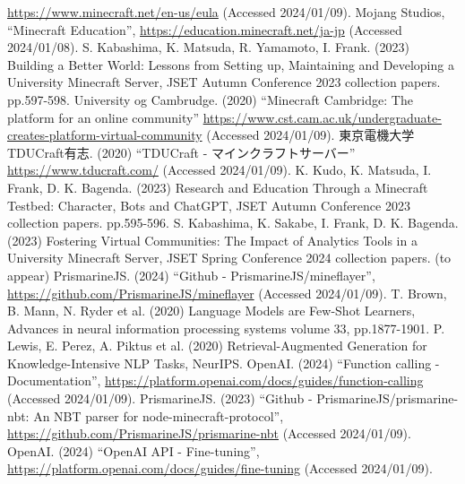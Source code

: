 \begin{thebibliography}{99}
    \url{https://www.minecraft.net/en-us/eula} (Accessed 2024/01/09).
    Mojang Studios, 
    ``Minecraft Education'', 
    \url{https://education.minecraft.net/ja-jp} (Accessed 2024/01/08).
    S. Kabashima, K. Matsuda, R. Yamamoto, I. Frank. (2023) 
    Building a Better World: Lessons from Setting up, Maintaining and Developing a University Minecraft Server, 
    JSET Autumn Conference 2023 collection papers. pp.597-598.
    University og Cambrudge. (2020)
    ``Minecraft Cambridge: The platform for an online community''
    \url{https://www.cst.cam.ac.uk/undergraduate-creates-platform-virtual-community} (Accessed 2024/01/09).
    東京電機大学 TDUCraft有志. (2020)
    ``TDUCraft - マインクラフトサーバー''
    \url{https://www.tducraft.com/} (Accessed 2024/01/09).
    K. Kudo, K. Matsuda, I. Frank, D. K. Bagenda. (2023)
    Research and Education Through a Minecraft Testbed: Character, Bots and ChatGPT,
    JSET Autumn Conference 2023 collection papers. pp.595-596.
    S. Kabashima, K. Sakabe, I. Frank, D. K. Bagenda. (2023) 
    Fostering Virtual Communities: The Impact of Analytics Tools in a University Minecraft Server, 
    JSET Spring Conference 2024 collection papers. (to appear)
    PrismarineJS. (2024) 
    ``Github - PrismarineJS/mineflayer'', 
    \url{https://github.com/PrismarineJS/mineflayer} (Accessed 2024/01/09).
    T. Brown, B. Mann, N. Ryder et al. (2020) 
    Language Models are Few-Shot Learners, 
    Advances in neural information processing systems volume 33, pp.1877-1901.
    P. Lewis, E. Perez, A. Piktus et al. (2020) 
    Retrieval-Augmented Generation for Knowledge-Intensive NLP Tasks, 
    NeurIPS.
    OpenAI. (2024)
    ``Function calling -Documentation'',
    \url{https://platform.openai.com/docs/guides/function-calling} (Accessed 2024/01/09).
    PrismarineJS. (2023) 
    ``Github - PrismarineJS/prismarine-nbt: An NBT parser for node-minecraft-protocol'', 
    \url{https://github.com/PrismarineJS/prismarine-nbt} (Accessed 2024/01/09).
    OpenAI. (2024) 
    ``OpenAI API - Fine-tuning'', 
    \url{https://platform.openai.com/docs/guides/fine-tuning} (Accessed 2024/01/09).







\end{thebibliography}
